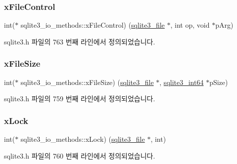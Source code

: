 \subsubsection{\texorpdfstring{x\+File\+Control}{xFileControl}}
{\footnotesize\ttfamily int($\ast$ sqlite3\+\_\+io\+\_\+methods\+::x\+File\+Control) (\hyperlink{structsqlite3__file}{sqlite3\+\_\+file} $\ast$, int op, void $\ast$p\+Arg)}



sqlite3.\+h 파일의 763 번째 라인에서 정의되었습니다.

\mbox{\label{structsqlite3__io__methods_ae875f158de72435f40ca0bd5207d9862}} 
\subsubsection{\texorpdfstring{x\+File\+Size}{xFileSize}}
{\footnotesize\ttfamily int($\ast$ sqlite3\+\_\+io\+\_\+methods\+::x\+File\+Size) (\hyperlink{structsqlite3__file}{sqlite3\+\_\+file} $\ast$, \hyperlink{sqlite3_8h_a0a4d3e6c1ad46f90e746b920ab6ca0d2}{sqlite3\+\_\+int64} $\ast$p\+Size)}



sqlite3.\+h 파일의 759 번째 라인에서 정의되었습니다.

\mbox{\label{structsqlite3__io__methods_ac88793475b0c4188fb02c229f1a11e8b}} 
\subsubsection{\texorpdfstring{x\+Lock}{xLock}}
{\footnotesize\ttfamily int($\ast$ sqlite3\+\_\+io\+\_\+methods\+::x\+Lock) (\hyperlink{structsqlite3__file}{sqlite3\+\_\+file} $\ast$, int)}



sqlite3.\+h 파일의 760 번째 라인에서 정의되었습니다.

\mbox{\label{structsqlite3__io__methods_ac1433ffc0da0414a2a67a46d338d83eb}} 
